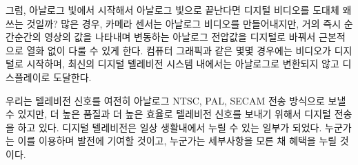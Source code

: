 그럼, 아날로그 빛에서 시작해서 아날로그 빛으로 끝난다면 디지털 비디오를 도대체 왜 쓰는 것일까?
많은 경우, 카메라 센서는 아날로그 비디오를 만들어내지만, 거의 즉시 순간순간의 영상의 값을 나타내며 변동하는 아날로그 전압값을 디지털로 바꿔서 근본적으로 열화 없이 다룰 수 있게 한다.
컴퓨터 그래픽과 같은 몇몇 경우에는 비디오가 디지털로 시작하며, 최신의 디지털 텔레비전 시스템 내에서는 아날로그로 변환되지 않고 디스플레이로 도달한다.

우리는 텔레비전 신호를 여전히 아날로그 NTSC, PAL, SECAM 전송 방식으로 보낼 수 있지만, 더 높은 품질과 더 높은 효율로 텔레비전 신호를 보내기 위해서 디지털 전송을 하고 있다.
디지털 텔레비전은 일상 생활내에서 누릴 수 있는 일부가 되었다. 누군가는 이를 이용하며 발전에 기여할 것이고, 누군가는 세부사항을 모른 채 혜택을 누릴 것이다.